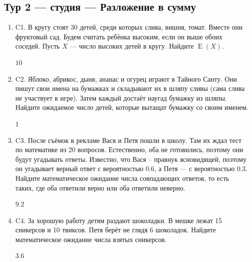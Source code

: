 \documentclass[12pt]{article}
\DeclareMathOperator{\E}{E}
\newenvironment{problem}{}{}
\newenvironment{sol}{}{} %
\begin{document}
\newpage
\subsection{Тур 2 — студия — Разложение в сумму}

\begin{enumerate}
\begin{problem}
\item[C1.] В кругу стоят 30 детей, среди которых слива, вишня, томат. Вместе они фруктовый сад. Будем считать ребёнка высоким, если он выше обоих соседей. Пусть $X$ — число высоких детей в кругу. Найдите $\E(X)$.

\begin{sol}
$10$
\end{sol}
\end{problem}

\begin{problem}
\item[C2.] Яблоко, абрикос, дыня, ананас и огурец играют в Тайного Санту. Они пишут свои имена на бумажках и складывают их в шляпу сливы (сама слива не участвует в игре). Затем каждый достаёт наугад бумажку из шляпы. Найдите ожидаемое число детей, которые вытащат бумажку со своим именем.

\begin{sol}
$1$
\end{sol}
\end{problem}

\begin{problem}
\item[C3.] После съёмок в рекламе Вася и Петя пошли в школу. Там их ждал тест по математике из 20 вопросов. Естественно, оба не готовились, поэтому они будут угадывать ответы. Известно, что Вася – правнук ясновидящей, поэтому он угадывает верный ответ с вероятностью $0.6$, а Петя — с вероятностью $0.3$. Найдите математическое ожидание числа совпадающих ответов, то есть таких, где оба ответили верно или оба ответили неверно.

\begin{sol}
$9.2$
\end{sol}
\end{problem}

\begin{problem}
\item[C4.] За хорошую работу детям раздают шоколадки. В мешке лежат 15 сникерсов и 10 твиксов. Петя берёт не глядя 6 шоколадок. Найдите математическое ожидание числа взятых сникерсов.

\begin{sol}
$3.6$
\end{sol}
\end{problem}
\end{enumerate}
\end{document}
